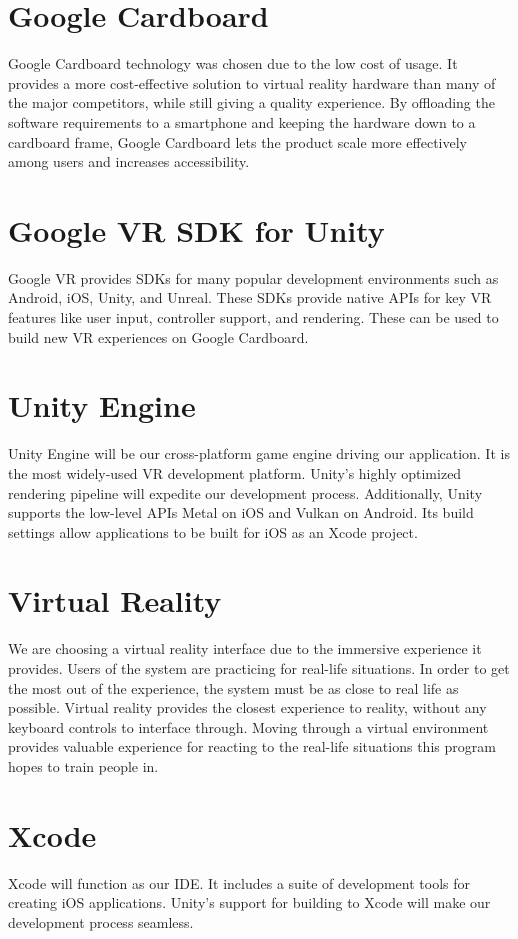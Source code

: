\section{Google Cardboard}
Google Cardboard technology was chosen due to the low cost of usage. It provides a more cost-effective solution to virtual reality hardware than many of the major competitors, while still giving a quality experience. By offloading the software requirements to a smartphone and keeping the hardware down to a cardboard frame, Google Cardboard lets the product scale more effectively among users and increases accessibility.
    
\section{Google VR SDK for Unity}

Google VR provides SDKs for many popular development environments such as Android, iOS, Unity, and Unreal. These SDKs provide native APIs for key VR features like user input, controller support, and rendering. These can be used to build new VR experiences on Google Cardboard.

\section{Unity Engine}

Unity Engine will be our cross-platform game engine driving our application. It is the most widely-used VR development platform. Unity's highly optimized rendering pipeline will expedite our development process. Additionally, Unity supports the low-level APIs Metal on iOS and Vulkan on Android. Its build settings allow applications to be built for iOS as an Xcode project.

\section{Virtual Reality}
We are choosing a virtual reality interface due to the immersive experience it provides. Users of the system are practicing for real-life situations. In order to get the most out of the experience, the system must be as close to real life as possible. Virtual reality provides the closest experience to reality, without any keyboard controls to interface through. Moving through a virtual environment provides valuable experience for reacting to the real-life situations this program hopes to train people in.

\section{Xcode}
Xcode will function as our IDE. It includes a suite of development tools for creating iOS applications. Unity's support for building to Xcode will make our development process seamless.
